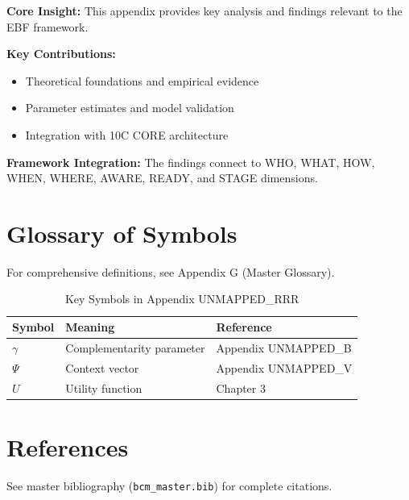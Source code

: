 \begin{tcolorbox}[colback=gray!5!white, colframe=gray!75!black,
    title=Appendix UNMAPPED_RRR Summary]

\textbf{Core Insight:}
This appendix provides key analysis and findings relevant to the EBF framework.

\textbf{Key Contributions:}
\begin{itemize}[nosep]
    \item Theoretical foundations and empirical evidence
    \item Parameter estimates and model validation
    \item Integration with 10C CORE architecture
\end{itemize}

\textbf{Framework Integration:}
The findings connect to WHO, WHAT, HOW, WHEN, WHERE, AWARE, READY, and STAGE dimensions.

\end{tcolorbox}

\section{Glossary of Symbols}
\label{sec:rrr-glossary}

For comprehensive definitions, see Appendix G (Master Glossary).

\begin{table}[htbp]
\centering
\caption{Key Symbols in Appendix UNMAPPED_RRR}
\begin{tabular}{lll}
\toprule
\textbf{Symbol} & \textbf{Meaning} & \textbf{Reference} \\
\midrule
$\gamma$ & Complementarity parameter & Appendix UNMAPPED_B \\
$\Psi$ & Context vector & Appendix UNMAPPED_V \\
$U$ & Utility function & Chapter 3 \\
\bottomrule
\end{tabular}
\end{table}


\section{References}
\label{sec:references}

See master bibliography (\texttt{bcm\_master.bib}) for complete citations.

\nocite{bcm_master}


